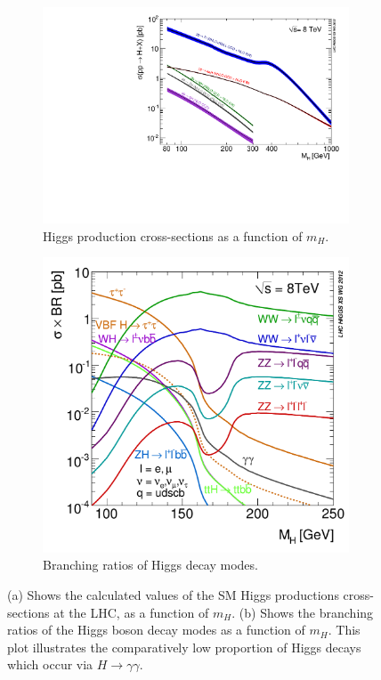 \documentclass[10pt]{article}
\begin{document}
\begin{figure}[h!]
  \centering
  \begin{subfigure}{0.5\textwidth}
\includegraphics[width=\textwidth]{"Higgs_XS"}
\caption{Higgs production cross-sections as a function of $m_H$.}
\label{H_XS_fig}
\end{subfigure}
\quad\quad\quad
  \begin{subfigure}{0.37\textwidth}
  
\includegraphics[width=\textwidth]{"Higgs_BR"}
\caption{Branching ratios of Higgs decay modes.}
\label{H_BR_fig}
\end{subfigure}
\caption{(a) Shows the calculated values of the SM Higgs productions cross-sections at the LHC, as a function of $m_H$. (b) Shows the branching ratios of the Higgs boson decay modes as a function of $m_H$. This plot illustrates the comparatively low proportion of Higgs decays which occur via $H\rightarrow\gamma\gamma$.~\cite{H_XS1,H_XS2}}
\end{figure}
\end{document}
